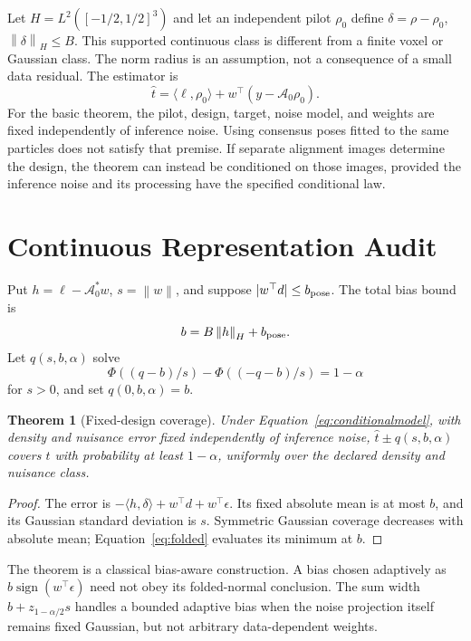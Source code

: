 \documentclass{article}
\newtheorem{theorem}{Theorem}
\newcommand{\norm}[1]{\left\|#1\right\|}
\newcommand{\ip}[2]{\langle #1,#2\rangle}
\newcommand{\A}{\mathcal A}
\begin{document}
Let $H=L^2([-1/2,1/2]^3)$ and let an independent pilot $\rho_0$ define $\delta=\rho-\rho_0$, $\norm\delta_H\le B$. This supported continuous class is different from a finite voxel or Gaussian class. The norm radius is an assumption, not a consequence of a small data residual. The estimator is
\begin{equation}\label{eq:affine}
\widehat t=\ip{\ell}{\rho_0}+w^\top(y-\A_0\rho_0).
\end{equation}
For the basic theorem, the pilot, design, target, noise model, and weights are fixed independently of inference noise. Using consensus poses fitted to the same particles does not satisfy that premise. If separate alignment images determine the design, the theorem can instead be conditioned on those images, provided the inference noise and its processing have the specified conditional law.

\section{Continuous Representation Audit}
Put $h=\ell-\A_0^*w$, $s=\norm w$, and suppose $|w^\top d|\le b_{\rm pose}$. The total bias bound is
\begin{equation}\label{eq:bias}
b=B\norm h_H+b_{\rm pose}.
\end{equation}
Let $q(s,b,\alpha)$ solve
\begin{equation}\label{eq:folded}
\Phi((q-b)/s)-\Phi((-q-b)/s)=1-\alpha
\end{equation}
for $s>0$, and set $q(0,b,\alpha)=b$.

\begin{theorem}[Fixed-design coverage]\label{thm:coverage}
Under Equation~\eqref{eq:conditionalmodel}, with density and nuisance error fixed independently of inference noise, $\widehat t\pm q(s,b,\alpha)$ covers $t$ with probability at least $1-\alpha$, uniformly over the declared density and nuisance class.
\end{theorem}
\begin{proof}
The error is $-\ip{h}{\delta}+w^\top d+w^\top\epsilon$. Its fixed absolute mean is at most $b$, and its Gaussian standard deviation is $s$. Symmetric Gaussian coverage decreases with absolute mean; Equation~\eqref{eq:folded} evaluates its minimum at $b$.
\end{proof}
The theorem is a classical bias-aware construction. A bias chosen adaptively as $b\operatorname{sign}(w^\top\epsilon)$ need not obey its folded-normal conclusion. The sum width $b+z_{1-\alpha/2}s$ handles a bounded adaptive bias when the noise projection itself remains fixed Gaussian, but not arbitrary data-dependent weights.
\end{document}
